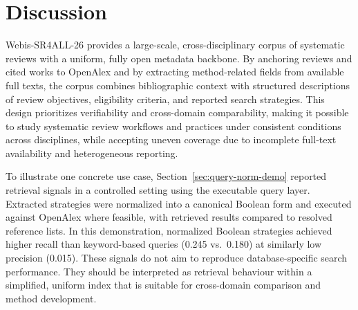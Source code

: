 \section{Discussion}

Webis-SR4ALL-26 provides a large-scale, cross-disciplinary corpus of systematic reviews with a uniform, fully open metadata backbone. By anchoring reviews and cited works to OpenAlex and by extracting method-related fields from available full texts, the corpus combines bibliographic context with structured descriptions of review objectives, eligibility criteria, and reported search strategies. This design prioritizes verifiability and cross-domain comparability, making it possible to study systematic review workflows and practices under consistent conditions across disciplines, while accepting uneven coverage due to incomplete full-text availability and heterogeneous reporting.

To illustrate one concrete use case, Section~\ref{sec:query-norm-demo} reported retrieval signals in a controlled setting using the executable query layer. Extracted strategies were normalized into a canonical Boolean form and executed against OpenAlex where feasible, with retrieved results compared to resolved reference lists. In this demonstration, normalized Boolean strategies achieved higher recall than keyword-based queries (0.245 vs.\ 0.180) at similarly low precision (0.015). These signals do not aim to reproduce database-specific search performance. They should be interpreted as retrieval behaviour within a simplified, uniform index that is suitable for cross-domain comparison and method development.

